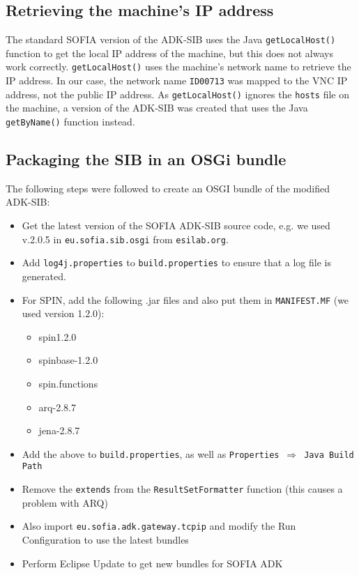 \subsection{Retrieving the machine's IP address}
The standard SOFIA version of the ADK-SIB uses the Java \texttt{getLocalHost()} function to get the local IP address of the machine, but this does not always work correctly. \texttt{getLocalHost()} uses the machine's network name to retrieve the IP address. In our case, the network name \texttt{ID00713} was mapped to the VNC IP address, not the public IP address. As \texttt{getLocalHost()} ignores the \texttt{hosts} file on the machine, a version of the ADK-SIB was created that uses the Java \texttt{getByName()} function instead.

\subsection{Packaging the SIB in an OSGi bundle}
The following steps were followed to create an OSGI bundle of the modified ADK-SIB:

\begin{itemize}
	\item Get the latest version of the SOFIA ADK-SIB source code, e.g. we used v.2.0.5 in \texttt{eu.sofia.sib.osgi} from \texttt{esilab.org}.
	\item Add \texttt{log4j.properties} to \texttt{build.properties} to ensure that a log file is generated.
	\item For SPIN, add the following .jar files and also put them in \texttt{MANIFEST.MF} (we used version 1.2.0):
	\begin{itemize}
		\item spin1.2.0
		\item spinbase-1.2.0
		\item spin.functions
		\item arq-2.8.7
		\item jena-2.8.7
	\end{itemize}
	\item Add the above to \texttt{build.properties}, as well as \texttt{Properties}~$\Rightarrow$~\texttt{Java Build Path}
	\item Remove the \texttt{extends} from the \texttt{ResultSetFormatter} function (this causes a problem with ARQ)
	\item Also import \texttt{eu.sofia.adk.gateway.tcpip} and modify the Run Configuration to use the latest bundles
	\item Perform Eclipse Update to get new bundles for SOFIA ADK
	
\end{itemize}


